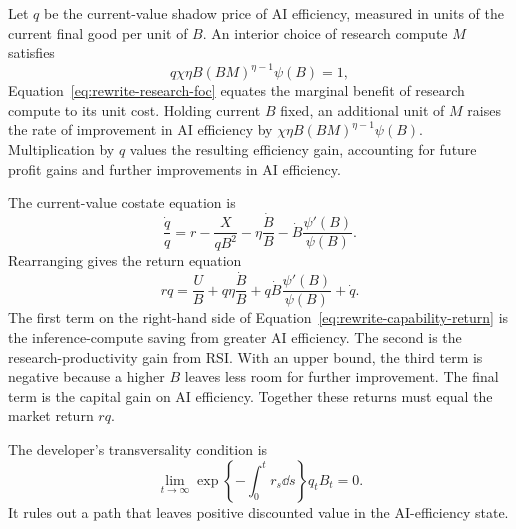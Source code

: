 Let $q$ be the current-value shadow price of AI efficiency, measured in units of
the current final good per unit of $B$. An interior choice of research compute $M$ satisfies
\begin{equation}
 q\chi\eta B(BM)^{\eta-1}\psi(B)=1,
 \label{eq:rewrite-research-foc}
\end{equation}
Equation~\eqref{eq:rewrite-research-foc} equates the marginal benefit of research compute to its unit cost. Holding current $B$ fixed, an additional unit of $M$ raises the rate of improvement in AI efficiency by \(\chi\eta B(BM)^{\eta-1}\psi(B)\).
Multiplication by $q$ values the resulting efficiency gain, accounting for future profit gains and further improvements in AI efficiency. %

The current-value costate equation is
\begin{equation}
 \frac{\dot q}{q}=r-\frac{X}{qB^2}-\eta\frac{\dot B}{B}
 -\dot B\frac{\psi'(B)}{\psi(B)}.
 \label{eq:rewrite-costate}
\end{equation}
Rearranging gives the return equation
\begin{equation}
 rq=\frac{U}{B}+q\eta\frac{\dot B}{B}
 +q\dot B\frac{\psi'(B)}{\psi(B)}+\dot q.
 \label{eq:rewrite-capability-return}
\end{equation}
The first term on the right-hand side of Equation~\eqref{eq:rewrite-capability-return} is the inference-compute saving from greater AI efficiency. The
second is the research-productivity gain from RSI. With an upper bound, the third
term is negative because a higher $B$ leaves less room for further improvement. The final term is the capital gain on AI efficiency. Together these
returns must equal the market return $rq$.

The developer's transversality condition is
\begin{equation}
 \lim_{t\to\infty}
 \exp\left\{-\int_0^t r_s\dd s\right\}q_tB_t=0.
 \label{eq:rewrite-developer-tvc}
\end{equation}
It rules out a path that leaves positive discounted value in the AI-efficiency state.%

